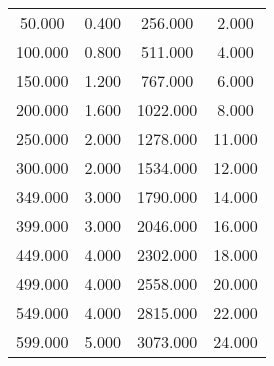 
\begin{table}[h]
\centering
\begin{tabular}{cccc}
\toprule
50.000	&	0.400	&	256.000	&	2.000	 \\ 
100.000	&	0.800	&	511.000	&	4.000	 \\ 
150.000	&	1.200	&	767.000	&	6.000	 \\ 
200.000	&	1.600	&	1022.000	&	8.000	 \\ 
250.000	&	2.000	&	1278.000	&	11.000	 \\ 
300.000	&	2.000	&	1534.000	&	12.000	 \\ 
349.000	&	3.000	&	1790.000	&	14.000	 \\ 
399.000	&	3.000	&	2046.000	&	16.000	 \\ 
449.000	&	4.000	&	2302.000	&	18.000	 \\ 
499.000	&	4.000	&	2558.000	&	20.000	 \\ 
549.000	&	4.000	&	2815.000	&	22.000	 \\ 
599.000	&	5.000	&	3073.000	&	24.000	 \\ 
\bottomrule
\end{tabular}
\end{table}
